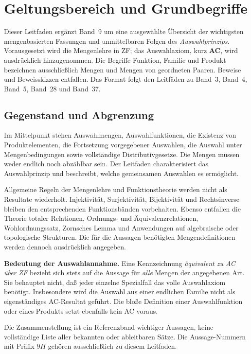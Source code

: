 \chapter{Geltungsbereich und Grundbegriffe}

Dieser Leitfaden ergänzt Band~9 um eine ausgewählte Übersicht der
wichtigsten mengenbasierten Fassungen und unmittelbaren Folgen des
\emph{Auswahlprinzips}. Vorausgesetzt wird die Mengenlehre in ZF;
das Auswahlaxiom, kurz \textbf{AC}, wird ausdrücklich hinzugenommen.
Die Begriffe Funktion, Familie und Produkt bezeichnen ausschließlich
Mengen und Mengen von geordneten Paaren. Beweise und Beweisskizzen
entfallen. Das Format folgt den Leitfäden zu Band~3, Band~4, Band~5,
Band~28 und Band~37.

\section{Gegenstand und Abgrenzung}

Im Mittelpunkt stehen Auswahlmengen, Auswahlfunktionen, die Existenz
von Produktelementen, die Fortsetzung vorgegebener Auswahlen,
die Auswahl unter Mengenbedingungen sowie vollständige
Distributivgesetze. Die Mengen müssen weder endlich noch abzählbar sein.
Der Leitfaden charakterisiert das Auswahlprinzip und beschreibt,
welche gemeinsamen Auswahlen es ermöglicht.

Allgemeine Regeln der Mengenlehre und Funktionstheorie werden
nicht als Resultate wiederholt. Injektivität, Surjektivität,
Bijektivität und Rechtsinverse bleiben den entsprechenden
Funktionsbänden vorbehalten. Ebenso entfallen die Theorie totaler
Relationen, Ordnungs- und Äquivalenzrelationen, Wohlordnungssatz,
Zornsches Lemma und Anwendungen auf algebraische oder topologische
Strukturen. Die für die Aussagen benötigten Mengendefinitionen
werden dennoch ausdrücklich angegeben.

\textbf{Bedeutung der Auswahlannahme.}
Eine Kennzeichnung \emph{äquivalent zu AC über ZF} bezieht sich
stets auf die Aussage für \emph{alle} Mengen der angegebenen Art.
Sie behauptet nicht, daß jeder einzelne Spezialfall das volle
Auswahlaxiom benötigt. Insbesondere wird die Auswahl aus einer
endlichen Familie nicht als eigenständiges AC-Resultat geführt.
Die bloße Definition einer Auswahlfunktion oder eines Produkts
setzt ebenfalls kein AC voraus.

Die Zusammenstellung ist ein Referenzband wichtiger Aussagen,
keine vollständige Liste aller bekannten oder ableitbaren Sätze.
Die Aussage-Nummern mit Präfix $9H$ gehören ausschließlich zu
diesem Leitfaden.

